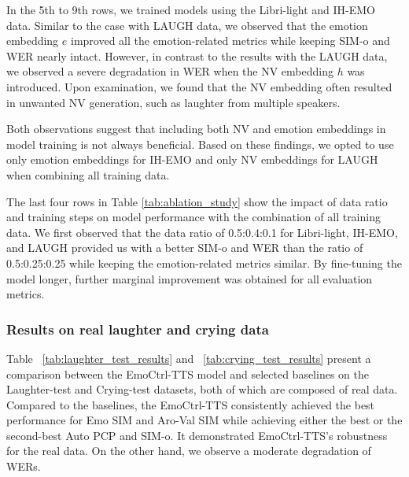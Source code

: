 In the 5th to 9th rows, we trained models using the Libri-light and IH-EMO data. Similar to the case with LAUGH data, we observed that the emotion embedding $e$ improved all the emotion-related metrics while keeping SIM-o and WER nearly intact. However, in contrast to the results with the LAUGH data, we observed a severe degradation in WER when the NV embedding $h$ was introduced. Upon examination, we found that the NV embedding often resulted in unwanted NV generation, such as laughter from multiple speakers.

Both observations suggest that including both NV and emotion embeddings in model training is not always beneficial. Based on these findings, we opted to use only emotion embeddings for IH-EMO and only NV embeddings for LAUGH when combining all training data.


The last four rows in Table \ref{tab:ablation_study} show the impact of data ratio and training steps on model performance with the combination of all training data.
We first observed that
the data ratio of 0.5:0.4:0.1 for Libri-light, IH-EMO, and LAUGH provided
us with a better SIM-o and WER than the ratio of 0.5:0.25:0.25
while keeping the emotion-related metrics similar. 
By fine-tuning the model longer,
further marginal improvement was obtained for all evaluation metrics.



\vspace{-.5em}
\subsubsection{Results on real laughter and crying data}
\vspace{-.5em}

Table ~\ref{tab:laughter_test_results} and ~\ref{tab:crying_test_results} present a comparison between the EmoCtrl-TTS model and selected baselines on the Laughter-test and Crying-test datasets, both of which are composed of real data. Compared to the baselines, the EmoCtrl-TTS consistently achieved
the best performance for Emo SIM and Aro-Val SIM while achieving either the best or the second-best Auto PCP and SIM-o.
It demonstrated EmoCtrl-TTS's robustness for the real data. 
On the other hand, we observe a moderate degradation of WERs. 
